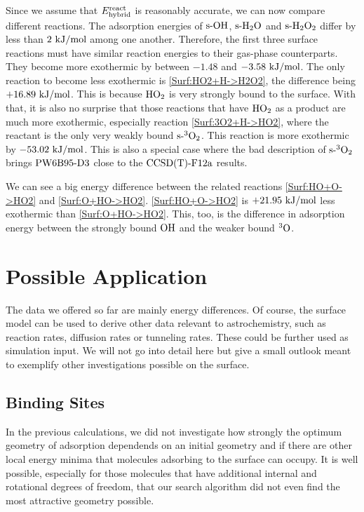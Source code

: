 \documentclass[8.5pt,twoside,twocolumn]{article}
\newcommand\sur{\enmat{\te{s-}}}
\newcommand\tripo{\enmat{{^3\te{O}}}}
\newcommand\tripot{\enmat{{^3\ot}}}
\newcommand\kmo{\enmat{\te {kJ/mol}}}
\theoremstyle{standard}
\begin{document}
Since we assume that $E^{\text{react}}_{\text{hybrid}}$ is reasonably accurate, we can now compare
different reactions. The adsorption energies of $\sur\ho$, $\sur\hto$ and
$\sur\htot$ differ by less than $2~\kmo$ among one another. Therefore,
the first three surface reactions must have similar reaction energies
to their gas-phase counterparts. They become more exothermic by between
$-1.48$ and $-3.58~\kmo$. The only reaction to become less exothermic
is \eqref{Surf:HO2+H->H2O2}, the difference being $+16.89~\kmo$. This
is because $\text H \text O_2$ is very strongly
bound to the surface. With that, it is also no surprise that those
reactions that have $\text H \text O_2$ as a product are much more exothermic, especially
reaction \eqref{Surf:3O2+H->HO2}, where the reactant is the only
very weakly bound $\sur\tripot$. This reaction is more exothermic
by $-53.02~\kmo$. This is also a special case where the bad description
of $\sur\tripot$ brings $\text{PW6B95}\text{-D3}$ close to the $\text{CCSD(T)-F12a}$ results.

We can see a big energy difference between the related reactions
\eqref{Surf:HO+O->HO2} and \eqref{Surf:O+HO->HO2}. \eqref{Surf:HO+O->HO2}
is $+21.95~\kmo$ less exothermic than \eqref{Surf:O+HO->HO2}. This, too,
is the difference in adsorption energy between the strongly bound $\text O \text H$
and the weaker bound $\tripo$.

\section{Possible Application}

The data we offered so far are mainly energy differences. Of course, the
surface model can be used to derive other data relevant to astrochemistry,
such as reaction rates, diffusion rates or tunneling rates. These could be
further used as simulation input. We will not go into detail here but give a small
outlook meant to exemplify other investigations possible on the surface. 

\subsection{Binding Sites}
\newcommand\rmax{\enmat{r_{\te{max}}}}
\newcommand\rmin{\enmat{r_{\te{min}}}}
\label{Sec:Adv:Binding}


In the previous calculations, we did not investigate how strongly the optimum
geometry of adsorption dependends on an initial geometry and if there
are other local energy minima that molecules adsorbing to the surface can occupy.
It is well possible, especially for those molecules that have additional
internal and rotational degrees of freedom, that our search
algorithm did not even find the most attractive geometry possible.
\end{document}
